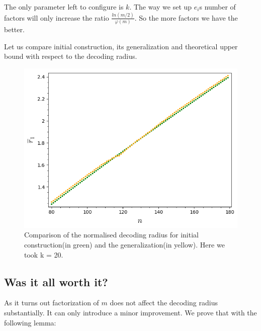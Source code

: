 \documentclass[12pt]{article}
\begin{document}
The only parameter left to configure is $k$. The way we set up $e_i$s number of factors will only increase the ratio $\frac{ln(m/2)}{\varphi(m)}$. So the more factors we have the better.

Let us compare initial construction, its generalization and theoretical upper bound with respect to the decoding radius.

\begin{figure}
  \includegraphics[width=\linewidth]{generalization_integers.png}
  \caption{Comparison of the normalised decoding radius for initial construction(in green) and the generalization(in yellow). Here we took k = 20. }
  \label{fig:gen_int}
\end{figure}


\subsection{Was it all worth it?}
\label{subsec:improvement_integers}


As it turns out factorization of $m$ does not affect the decoding radius substantially. It can only introduce a minor improvement. We prove that with the following lemma:
\end{document}
